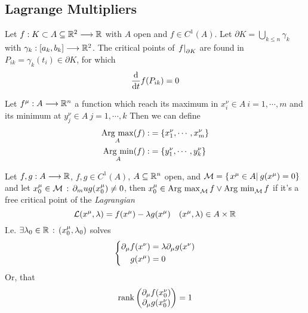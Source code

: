 \documentclass[../complete.tex]{subfiles}
\begin{document}
\subsection{Lagrange Multipliers}
\begin{dfn}
	Let $f:K\subset A\subseteq\R^2\fto\R$ with $A$ open and $f\in C^1(A)$. Let $\partial{K}=\bigcup_{k\le n}\gamma_k$ with $\gamma_k:[a_k,b_k]\fto\R^2$. The critical points of $\derin[\partial{K}]{f}$ are found in $P_{ik}=\gamma_k(t_i)\in\partial{K}$, for which
	\begin{equation*}
		\derivative{t}f(P_{ik})=0
	\end{equation*}
\end{dfn}
\begin{dfn}
	Let $f^\mu:A\fto\R^n$ a function which reach its maximum in $x^\nu_i\in A\ i=1,\cdots,m$ and its minimum at $y^\nu_j\in A\ j=1,\cdots,k$ Then we can define
	\begin{equation}
		\begin{aligned}
			\argmax_A(f):&=\{x^\nu_1,\cdots,x^\nu_m\}\\
			\argmin_A(f):&=\{y^\nu_1,\cdots,y^\nu_k\}
		\end{aligned}
		\label{eq:argminmax}
	\end{equation}
\end{dfn}
\begin{thm}
	Let $f,g:A\fto\R$, $f,g\in C^1(A)$, $A\subseteq\R^n$ open, and $\mathcal{M}=\{\derin{x^\mu\in A}g(x^\mu)=0\}$ and let $x^\mu_0\in\mathcal{M}\st\del_mu g(x^\mu_0)\ne0$, then $x^\mu_0\in\argmax_{\mathcal{M}}f\vee\argmin_{\mathcal{M}}f$ if it's a free critical point of the \textit{Lagrangian}
	\begin{equation}
		\mathcal{L}(x^\mu,\lambda)=f(x^\mu)-\lambda g(x^\mu)\quad(x^\mu,\lambda)\in A\times\R
		\label{eq:lagrangian}
	\end{equation}
	I.e. $\exists\lambda_0\in\R\st(x^\mu_0,\lambda_0)$ solves
	\begin{equation}
		\left\{ \begin{aligned}
				\del_\mu f(x^\nu)&=\lambda\del_\mu g(x^\nu)\\
				g(x^\mu)&=0
		\end{aligned} \right.
		\label{eq:lagrangesystem}
	\end{equation}
	Or, that
	\begin{equation*}
		\rank\begin{pmatrix}\del_\mu f(x^\nu_0)\\\del_\mu g(x^\nu_0)\end{pmatrix}=1
	\end{equation*}
\end{thm}
\end{document}

